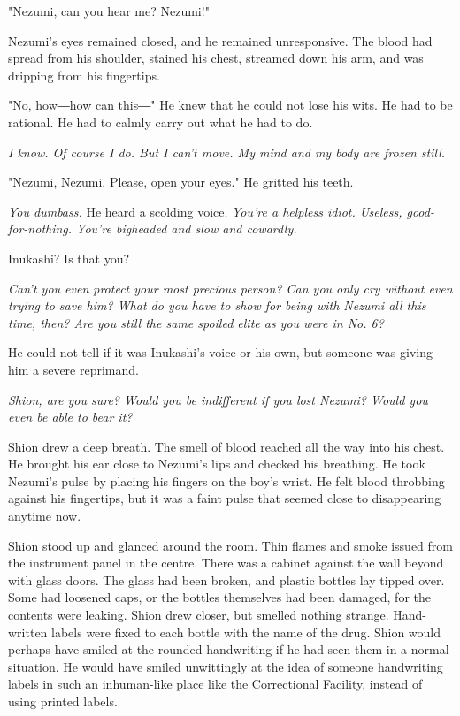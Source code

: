 "Nezumi, can you hear me? Nezumi!"

Nezumi's eyes remained closed, and he remained unresponsive. The blood
had spread from his shoulder, stained his chest, streamed down his arm,
and was dripping from his fingertips.

"No, how―how can this―" He knew that he could not lose his wits. He had
to be rational. He had to calmly carry out what he had to do.

\emph{I know. Of course I do. But I can't move. My mind and my body are frozen
	still.}

"Nezumi, Nezumi. Please, open your eyes." He gritted his teeth.

\emph{You dumbass.} He heard a scolding voice. \emph{You're a helpless idiot.
	Useless, good-for-nothing. You're bigheaded and slow and cowardly.}

Inukashi? Is that you?

\emph{Can't you even protect your most precious person? Can you only cry
	without even trying to save him? What do you have to show for being with
	Nezumi all this time, then? Are you still the same spoiled elite as you
	were in No. 6?}

He could not tell if it was Inukashi's voice or his own, but someone was
giving him a severe reprimand.

\emph{Shion, are you sure? Would you be indifferent if you lost Nezumi? Would
	you even be able to bear it?}

Shion drew a deep breath. The smell of blood reached all the way into
his chest. He brought his ear close to Nezumi's lips and checked his
breathing. He took Nezumi's pulse by placing his fingers on the boy's
wrist. He felt blood throbbing against his fingertips, but it was a
faint pulse that seemed close to disappearing anytime now.

Shion stood up and glanced around the room. Thin flames and smoke issued
from the instrument panel in the centre. There was a cabinet against the
wall beyond with glass doors. The glass had been broken, and plastic
bottles lay tipped over. Some had loosened caps, or the bottles
themselves had been damaged, for the contents were leaking. Shion drew
closer, but smelled nothing strange. Hand-written labels were fixed to
each bottle with the name of the drug. Shion would perhaps have smiled
at the rounded handwriting if he had seen them in a normal situation. He
would have smiled unwittingly at the idea of someone handwriting labels
in such an inhuman-like place like the Correctional Facility, instead of
using printed labels.

